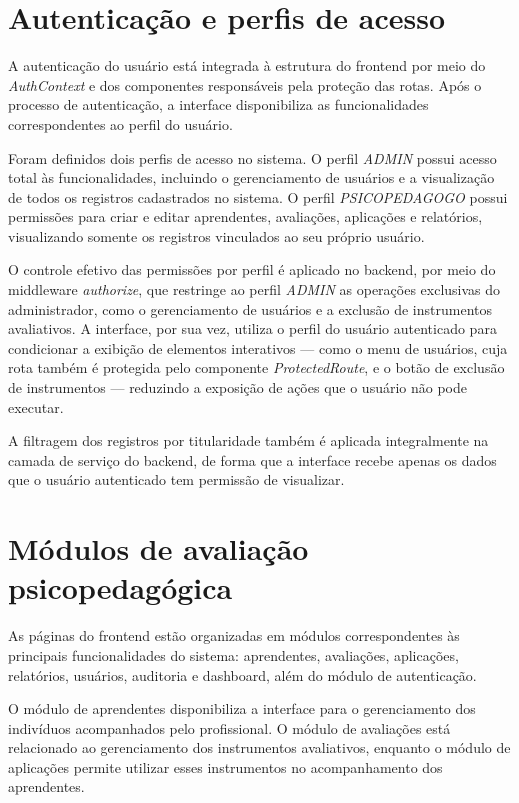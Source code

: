 \section{Autenticação e perfis de acesso}

A autenticação do usuário está integrada à estrutura do frontend por meio do \textit{AuthContext} e dos componentes responsáveis pela proteção das rotas. Após o processo de autenticação, a interface disponibiliza as funcionalidades correspondentes ao perfil do usuário.

Foram definidos dois perfis de acesso no sistema. O perfil \textit{ADMIN} possui acesso total às funcionalidades, incluindo o gerenciamento de usuários e a visualização de todos os registros cadastrados no sistema. O perfil \textit{PSICOPEDAGOGO} possui permissões para criar e editar aprendentes, avaliações, aplicações e relatórios, visualizando somente os registros vinculados ao seu próprio usuário.

O controle efetivo das permissões por perfil é aplicado no backend, por meio do middleware \textit{authorize}, que restringe ao perfil \textit{ADMIN} as operações exclusivas do administrador, como o gerenciamento de usuários e a exclusão de instrumentos avaliativos. A interface, por sua vez, utiliza o perfil do usuário autenticado para condicionar a exibição de elementos interativos — como o menu de usuários, cuja rota também é protegida pelo componente \textit{ProtectedRoute}, e o botão de exclusão de instrumentos — reduzindo a exposição de ações que o usuário não pode executar.

A filtragem dos registros por titularidade também é aplicada integralmente na camada de serviço do backend, de forma que a interface recebe apenas os dados que o usuário autenticado tem permissão de visualizar.

\section{Módulos de avaliação psicopedagógica}

As páginas do frontend estão organizadas em módulos correspondentes às principais funcionalidades do sistema: aprendentes, avaliações, aplicações, relatórios, usuários, auditoria e dashboard, além do módulo de autenticação.

O módulo de aprendentes disponibiliza a interface para o gerenciamento dos indivíduos acompanhados pelo profissional. O módulo de avaliações está relacionado ao gerenciamento dos instrumentos avaliativos, enquanto o módulo de aplicações permite utilizar esses instrumentos no acompanhamento dos aprendentes.

